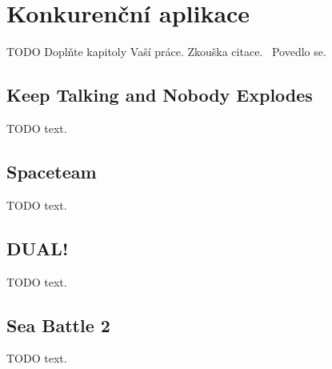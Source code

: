 \chapter{Konkurenční aplikace}

TODO Doplňte kapitoly Vaší práce. Zkouška citace.~\cite{rybicka} Povedlo se.

\section{Keep Talking and Nobody Explodes}

TODO text.

\section{Spaceteam}

TODO text.

\section{DUAL!}

TODO text.

\section{Sea Battle 2}

TODO text.
